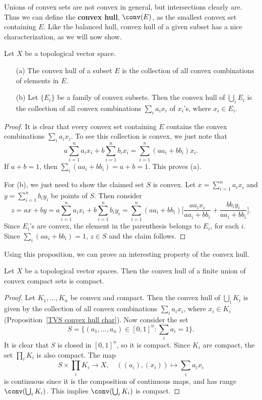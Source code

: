 Unions of convex sets are not convex in general, but intersections clearly are. Thus we can define the \textbf{convex hull}, $\conv(E)$, as the smallest convex set containing $E$. Like the balanced hull, convex hull of a given subset has a nice characterization, as we will now show.
\begin{proposition}\label{TVS convex hull char}
Let $X$ be a topological vector space.
\begin{itemize}
\item[(a)] The convex hull of a subset $E$ is the collection of all convex combinations of elements in $E$.
\item[(b)] Let $\{E_i\}$ be a family of convex subsets. Then the convex hull of $\bigcup_iE_i$ is the collection of all convex combinations $\sum_ia_ix_i$ of $x_i$'s, where $x_i\in E_i$. 
\end{itemize}
\end{proposition}
\begin{proof}
It is clear that every convex set containing $E$ contains the convex combinations $\sum_ia_ix_i$. To see this collection is convex, we just note that
\[a\sum_{i=1}^{n}a_ix_i+b\sum_{i=1}^{n}b_ix_i=\sum_{i=1}^{n}(aa_i+bb_i)x_i.\]
If $a+b=1$, then $\sum_i(aa_i+bb_i)=a+b=1$. This proves (a).\par
For (b), we just need to show the claimed set $S$ is convex. Let $x=\sum_{i=1}^{n}a_ix_i$ and $y=\sum_{i=1}^{n}b_iy_i$ be points of $S$. Then consider
\[z=ax+by=a\sum_{i=1}^{n}a_ix_i+b\sum_{i=1}^{n}b_iy_i=\sum_{i=1}^{n}(aa_i+bb_i)\Big[\frac{aa_ix_i}{aa_i+bb_i}+\frac{bb_iy_i}{aa_i+bb_i}\Big].\]
Since $E_i$'s are convex, the element in the parenthesis belongs to $E_i$, for each $i$. Since $\sum_i(aa_i+bb_i)=1$, $z\in S$ and the claim follows.
\end{proof}
Using this proposition, we can prove an interesting property of the convex hull.
\begin{proposition}\label{TVS convex hull of finite union of compact}
Let $X$ be a topological vector spaces. Then the convex hull of a finite union of convex compact sets is compact.
\end{proposition}
\begin{proof}
Let $K_1,\dots,K_n$ be convex and compact. Then the convex hull of $\bigcup_iK_i$ is given by the collection of all convex combinations $\sum_ia_ix_i$, where $x_i\in K_i$ (Proposition~\ref{TVS convex hull char}). Now consider the set
\[S=\{(a_1,\dots,a_n)\in[0,1]^n:\sum_ia_i=1\}.\]
It is clear that $S$ is closed in $[0,1]^n$, so it is compact. Since $K_i$ are compact, the set $\prod_iK_i$ is also compact. The map
\[S\times\prod_iK_i\to X,\quad ((a_i),(x_i))\mapsto\sum_ia_ix_i\]
is continuous since it is the composition of continuous maps, and has range $\conv(\bigcup_iK_i)$. This implies $\conv(\bigcup_iK_i)$ is compact.
\end{proof}
